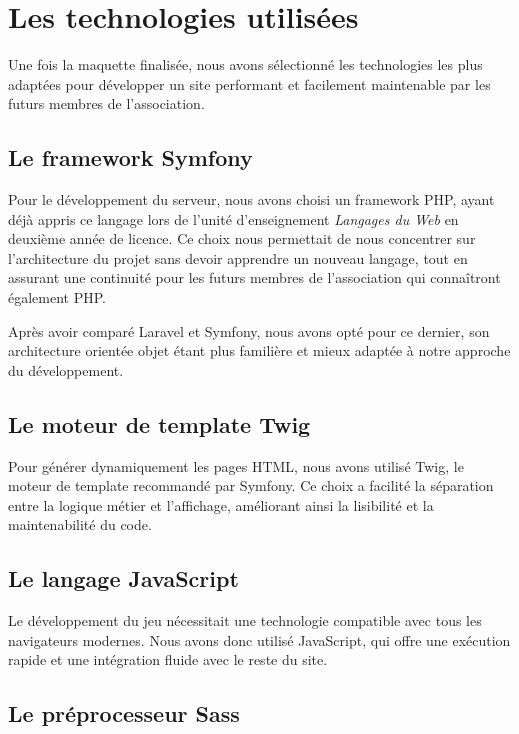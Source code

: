 
\section{Les technologies utilisées}

Une fois la maquette finalisée, nous avons sélectionné les technologies les plus adaptées pour développer un site performant et facilement maintenable par les futurs membres de l’association.

\subsection{Le framework Symfony}

Pour le développement du serveur, nous avons choisi un framework PHP, ayant déjà appris ce langage lors de l’unité d’enseignement \textit{Langages du Web} en deuxième année de licence. Ce choix nous permettait de nous concentrer sur l’architecture du projet sans devoir apprendre un nouveau langage, tout en assurant une continuité pour les futurs membres de l’association qui connaîtront également PHP.

Après avoir comparé Laravel et Symfony, nous avons opté pour ce dernier, son architecture orientée objet étant plus familière et mieux adaptée à notre approche du développement.

\subsection{Le moteur de template Twig}

Pour générer dynamiquement les pages HTML, nous avons utilisé Twig, le moteur de template recommandé par Symfony. Ce choix a facilité la séparation entre la logique métier et l'affichage, améliorant ainsi la lisibilité et la maintenabilité du code.

\subsection{Le langage JavaScript}

Le développement du jeu nécessitait une technologie compatible avec tous les navigateurs modernes. Nous avons donc utilisé JavaScript, qui offre une exécution rapide et une intégration fluide avec le reste du site.

\subsection{Le préprocesseur Sass}

